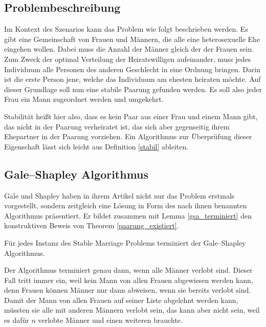 \subsection{Problembeschreibung}

Im Kontext des Szenarios kann das Problem wie folgt beschrieben werden. Es gibt eine Gemeinschaft von Frauen und Männern, die alle eine heterosexuelle Ehe eingehen wollen. Dabei muss die Anzahl der Männer gleich der der Frauen sein. Zum Zweck der optimal Verteilung der Heiratswilligen aufeinander, muss jedes Individuum alle Personen des anderen Geschlecht in eine Ordnung bringen. Darin ist die erste Person jene, welche das Individuum am ehesten heiraten möchte. Auf dieser Grundlage soll nun eine stabile Paarung gefunden werden. Es soll also jeder Frau ein Mann zugeordnet werden und umgekehrt.

Stabilität heißt hier also, dass es kein Paar aus einer Frau und einem Mann gibt, das nicht in der Paarung verheiratet ist, das sich aber gegenseitig ihrem Ehepartner in der Paarung vorziehen. Ein Algorithmus zur Überprüfung dieser Eigenschaft lässt sich leicht aus Definition \ref{stabil} ableiten.



\subsection{Gale–Shapley Algorithmus}

Gale und Shapley haben in ihrem Artikel \cite{Gale:1962} nicht nur das Problem erstmals vorgestellt, sondern zeitgleich eine Lösung in Form des nach ihnen benannten Algorithmus präsentiert. Er bildet zusammen mit Lemma \ref{gsa_terminiert} den konstruktiven Beweis von Theorem \ref{paarung_existiert}.



\begin{Lemma}
\label{gsa_terminiert}
  Für jedes Instanz des Stable Marriage Problems terminiert der Gale–Shapley Algorithmus.
\end{Lemma}

\begin{Beweis}
\label{gsa_terminiert_bew}
  Der Algorithmus terminiert genau dann, wenn alle Männer verlobt sind. Dieser Fall tritt immer ein, weil kein Mann von allen Frauen abgewiesen werden kann, denn Frauen können Männer nur dann abweisen, wenn sie bereits verlobt sind. Damit der Mann von allen Frauen auf seiner Liste abgelehnt werden kann, müssten sie alle mit anderen Männern verlobt sein, das kann aber nicht sein, weil es dafür $n$ verlobte Männer und einen weiteren brauchte.
\end{Beweis}

